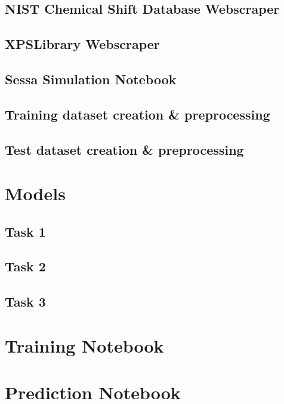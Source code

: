 \subsection{NIST Chemical Shift Database Webscraper}
\label{NIST_WebScraper}


\subsection{XPSLibrary Webscraper}
\label{xpslibrary_webscraper}


\subsection{Sessa Simulation Notebook}
\label{xpslibrary_webscraper}


\subsection{Training dataset creation \& preprocessing}
\label{train_data_generation}


\subsection{Test dataset creation \& preprocessing}
\label{train_data_generation}


\section{Models}
\subsection{Task 1}

\subsection{Task 2}

\subsection{Task 3}
\section{Training Notebook}

\section{Prediction Notebook}

